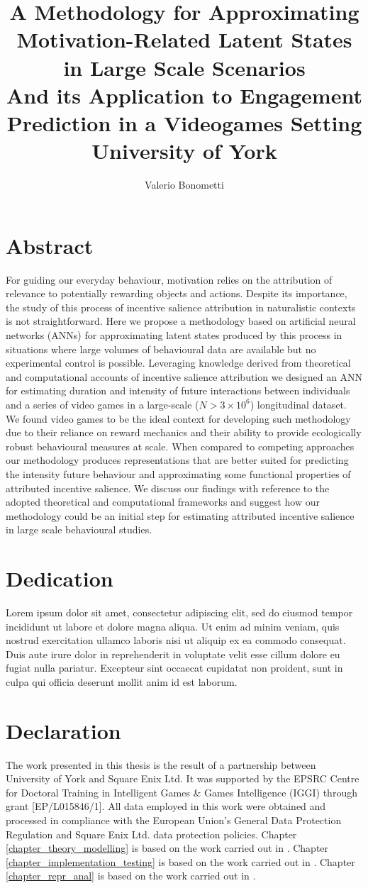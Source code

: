 \documentclass{yorkThesis}
\title{
{A Methodology for Approximating Motivation-Related Latent States in Large Scale Scenarios}\\
{\small And its Application to Engagement Prediction in a Videogames Setting}\\

{\large University of York}
}
\author{Valerio Bonometti}
\newcommand{\lorem}{Lorem ipsum dolor sit amet, consectetur adipiscing elit, sed do eiusmod tempor incididunt ut labore et dolore magna aliqua. Ut enim ad minim veniam, quis nostrud exercitation ullamco laboris nisi ut aliquip ex ea commodo consequat. Duis aute irure dolor in reprehenderit in voluptate velit esse cillum dolore eu fugiat nulla pariatur. Excepteur sint occaecat cupidatat non proident, sunt in culpa qui officia deserunt mollit anim id est laborum.\\}
\begin{document}
\maketitle

\chapter*{Abstract}
For guiding our everyday behaviour, motivation relies on the attribution of relevance to potentially rewarding objects and actions. Despite its importance, the study of this process of incentive salience attribution in naturalistic contexts is not straightforward. Here we propose a methodology based on artificial neural networks (ANNs) for approximating latent states produced by this process in situations where large volumes of behavioural data are available but no experimental control is possible. Leveraging knowledge derived from theoretical and computational accounts of incentive salience attribution we designed an ANN for estimating duration and intensity of future interactions between individuals and a series of video games in a large-scale ($N> 3 \times 10^6$) longitudinal dataset. We found video games to be the ideal context for developing such methodology due to their reliance on reward mechanics and their ability to provide ecologically robust behavioural measures at scale. When compared to competing approaches our methodology produces representations that are better suited for predicting the intensity future behaviour and approximating some functional properties of attributed incentive salience. We discuss our findings with reference to the adopted theoretical and computational frameworks and suggest how our methodology could be an initial step for estimating attributed incentive salience in large scale behavioural studies.

\chapter*{Dedication}
\lorem

\chapter*{Declaration}
The work presented in this thesis is the result of a partnership between University of York and Square Enix Ltd. It was supported by the EPSRC Centre for Doctoral Training in Intelligent Games \& Games Intelligence (IGGI) through grant [EP/L015846/1]. All data employed in this work were obtained and processed in compliance with the European Union's General Data Protection Regulation \cite{EUdataregulations2018} and Square Enix Ltd. data protection policies. Chapter \ref{chapter_theory_modelling} is based on the work carried out in \cite{bonometti2020theory, bonometti2021approximating}. Chapter \ref{chapter_implementation_testing} is based on the work carried out in \cite{bonometti2019modelling, bonometti2020theory, bonometti2021approximating}. Chapter \ref{chapter_repr_anal} is based on the work carried out in \cite{bonometti2021approximating}.
\end{document}

